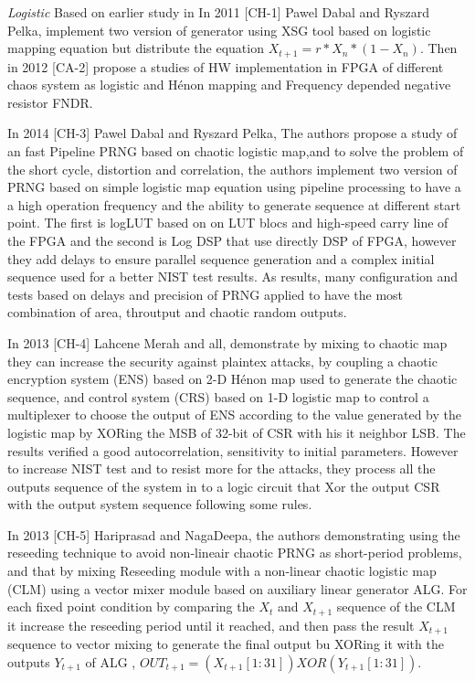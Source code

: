\textit{Logistic} Based on earlier study in In 2011 [CH-1] Pawel Dabal and Ryszard Pelka, implement two version of generator using XSG tool based on logistic mapping equation but distribute the equation $X_{t+1} = r*X_{n}*(1-X_{n})$. Then in 2012 [CA-2] propose a studies of HW implementation in FPGA of different chaos system as logistic and Hénon mapping and Frequency depended negative resistor FNDR.  

In 2014 [CH-3] Pawel Dabal and Ryszard Pelka, The authors propose a study of an fast Pipeline PRNG based on chaotic logistic map,and to solve the problem of the short cycle, distortion and correlation, the authors implement two version of PRNG based on simple logistic map equation using pipeline processing to have a a high operation frequency and the ability to generate sequence at different start point. The first is logLUT based on on LUT blocs and high-speed carry line of the FPGA and the second is Log DSP that use directly DSP of FPGA, however they add delays to ensure parallel sequence generation and a complex initial sequence used for a better NIST test results. As results, many configuration and tests based on delays and precision of PRNG applied to have the most combination of area, throutput and chaotic random outputs. 

In 2013 [CH-4] Lahcene Merah and all, demonstrate by mixing to chaotic map they can increase the security against plaintex attacks, by coupling a chaotic encryption system (ENS) based on 2-D Hénon map used to generate the chaotic sequence, and control system (CRS) based on 1-D logistic map to control a multiplexer to choose the output of ENS according to the value generated by the logistic map by XORing the MSB of 32-bit of CSR with his it neighbor LSB. The results verified a good autocorrelation, sensitivity to initial parameters. However to increase NIST test and to resist more for the attacks, they process all the outputs sequence of the system in to a logic circuit that Xor the output CSR with the output system sequence following some rules.

In 2013 [CH-5] Hariprasad and NagaDeepa, the authors demonstrating using the reseeding technique to avoid non-lineair chaotic PRNG as short-period problems, and that by mixing Reseeding module with a non-linear chaotic logistic map (CLM) using a vector mixer module based on auxiliary linear generator ALG. For each fixed point condition by comparing the $X_{t}$ and $X_{t+1}$ sequence of the CLM it increase the reseeding period until it reached, and then pass the result $X_{t+1}$ sequence to vector mixing to generate the final output bu XORing it with the outputs $Y_{t+1}$ of ALG , ${OUT_{t+1}={(X_{t+1}[1:31]) XOR (Y_{t+1}[1:31])}}$.

